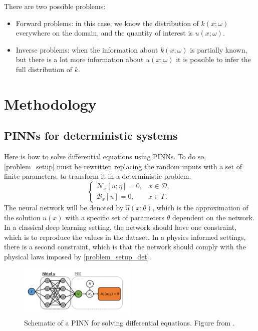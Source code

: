 \documentclass[11pt,a4paper]{article}
\begin{document}
There are two possible problems: 
\begin{itemize}
    \item Forward problems: in this case, we know the distribution of \(k(x;\omega)\) everywhere on the domain, and the quantity of interest is \(u(x;\omega)\).
    \item Inverse problems: when the information about \(k(x;\omega)\) is partially known, but there is a lot more information about \(u(x;\omega)\) it is possible to infer the full distribution of \(k\).
\end{itemize}

\section{Methodology}
\subsection{PINNs for deterministic systems}
Here is how to solve differential equations using PINNs. To do so, \eqref{problem_setup} must be rewritten replacing the random inputs with a set of finite parameters, to transform it in a deterministic problem.
\begin{equation}
    \begin{cases}
        \mathcal{N}_x\left[ u; \eta \right] = 0, & x \in \mathcal{D}, \\
        \mathcal{B}_x\left[ u \right] = 0, & x \in \Gamma.
    \end{cases}
    \label{problem_setup_det}
\end{equation}
The neural network will be denoted by \(\hat{u}(x;\theta)\), which is the approximation of the solution \(u(x)\) with a specific set of parameters \(\theta\) dependent on the network. In a classical deep learning setting, the network should have one constraint, which is to reproduce the values in the dataset. In a physics informed settings, there is a second constraint, which is that the network should comply with the physical laws imposed by \eqref{problem_setup_det}. 
\begin{figure}[H]
    \centering 
    \includegraphics[width=0.5\textwidth]{Images/PINN_structure.png}
    \captionsetup{justification=centering,margin=1cm}
    \caption{Schematic of a PINN for solving differential equations. Figure from \cite{Zhang_2019}.}
\end{figure}
\end{document}
